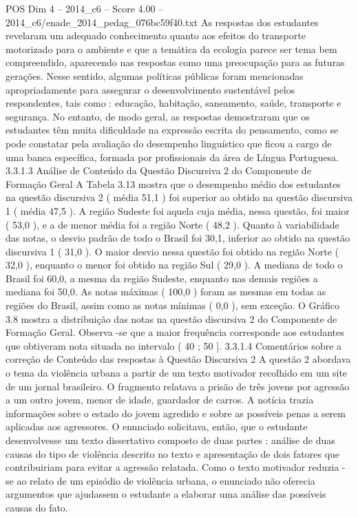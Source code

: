 \begin{textsample}{POS Dim 4 – 2014\_c6 – Score 4.00 – 2014\_c6/enade\_2014\_pedag\_076bc59f40.txt}
As respostas dos estudantes revelaram um adequado conhecimento quanto aos efeitos do transporte motorizado para o ambiente e que a temática da ecologia parece ser tema bem compreendido, aparecendo nas respostas como uma preocupação para as futuras gerações.
Nesse sentido, algumas políticas públicas foram mencionadas apropriadamente para assegurar o desenvolvimento sustentável pelos respondentes, tais como : educação, habitação, saneamento, saúde, transporte e segurança.
No entanto, de modo geral, as respostas demostraram que os estudantes têm muita dificuldade na expressão escrita do pensamento, como se pode constatar pela avaliação do desempenho linguístico que ficou a cargo de uma banca específica, formada por profissionais da área de Língua Portuguesa. 3.3.1.3 Análise de Conteúdo da Questão Discursiva 2 do Componente de Formação Geral A Tabela 3.13 mostra que o desempenho médio dos estudantes na questão discursiva 2 ( média 51,1 ) foi superior ao obtido na questão discursiva 1 ( média 47,5 ).
A região Sudeste foi aquela cuja média, nessa questão, foi maior ( 53,0 ), e a de menor média foi a região Norte ( 48,2 ).
Quanto à variabilidade das notas, o desvio padrão de todo o Brasil foi 30,1, inferior ao obtido na questão discursiva 1 ( 31,0 ).
O maior desvio nessa questão foi obtido na região Norte ( 32,0 ), enquanto o menor foi obtido na região Sul ( 29,0 ).
A mediana de todo o Brasil foi 60,0, a mesma da região Sudeste, enquanto nas demais regiões a mediana foi 50,0.
As notas máximas ( 100,0 ) foram as mesmas em todas as regiões do Brasil, assim como as notas mínimas ( 0,0 ), sem exceção.
O Gráfico 3.8 mostra a distribuição das notas na questão discursiva 2 do Componente de Formação Geral.
Observa -se que a maior frequência corresponde aos estudantes que obtiveram nota situada no intervalo ( 40 ; 50 ]. 3.3.1.4 Comentários sobre a correção de Conteúdo das respostas à Questão Discursiva 2 A questão 2 abordava o tema da violência urbana a partir de um texto motivador recolhido em um site de um jornal brasileiro.
O fragmento relatava a prisão de três jovens por agressão a um outro jovem, menor de idade, guardador de carros.
A notícia trazia informações sobre o estado do jovem agredido e sobre as possíveis penas a serem aplicadas aos agressores.
O enunciado solicitava, então, que o estudante desenvolvesse um texto dissertativo composto de duas partes : análise de duas causas do tipo de violência descrito no texto e apresentação de dois fatores que contribuiriam para evitar a agressão relatada.
Como o texto motivador reduzia -se ao relato de um episódio de violência urbana, o enunciado não oferecia argumentos que ajudassem o estudante a elaborar uma análise das possíveis causas do fato.

\end{textsample}
